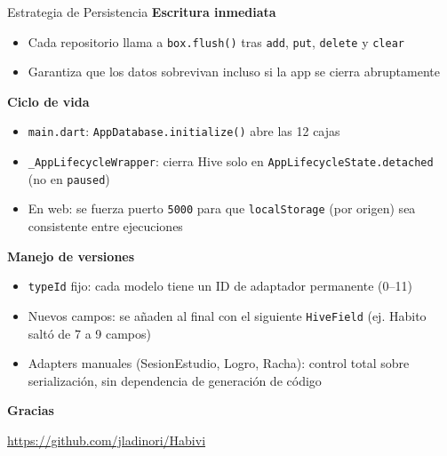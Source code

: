 \documentclass[11pt,landscape]{beamer}
\begin{document}
\begin{frame}{Estrategia de Persistencia}
  \textbf{Escritura inmediata}
  \begin{itemize}
    \item Cada repositorio llama a \texttt{box.flush()} tras \texttt{add},
          \texttt{put}, \texttt{delete} y \texttt{clear}
    \item Garantiza que los datos sobrevivan incluso si la app se cierra
          abruptamente
  \end{itemize}

  \vspace{0.3cm}
  \textbf{Ciclo de vida}
  \begin{itemize}
    \item \texttt{main.dart}: \texttt{AppDatabase.initialize()} abre las 12 cajas
    \item \texttt{\_AppLifecycleWrapper}: cierra Hive solo en
          \texttt{AppLifecycleState.detached} (no en \texttt{paused})
    \item En web: se fuerza puerto \texttt{5000} para que
          \texttt{localStorage} (por origen) sea consistente entre ejecuciones
  \end{itemize}

  \vspace{0.3cm}
  \textbf{Manejo de versiones}
  \begin{itemize}
    \item \texttt{typeId} fijo: cada modelo tiene un ID de adaptador
          permanente (0--11)
    \item Nuevos campos: se añaden al final con el siguiente \texttt{HiveField}
          (ej. Habito saltó de 7 a 9 campos)
    \item Adapters manuales (SesionEstudio, Logro, Racha): control total sobre
          serialización, sin dependencia de generación de código
  \end{itemize}
\end{frame}

\begin{frame}{}

  \vfill
  \centering
  {\Huge \textbf{Gracias}}
  \vspace{0.5cm}

  {\large \url{https://github.com/jladinori/Habivi}}
  \vfill

\end{frame}
\end{document}
